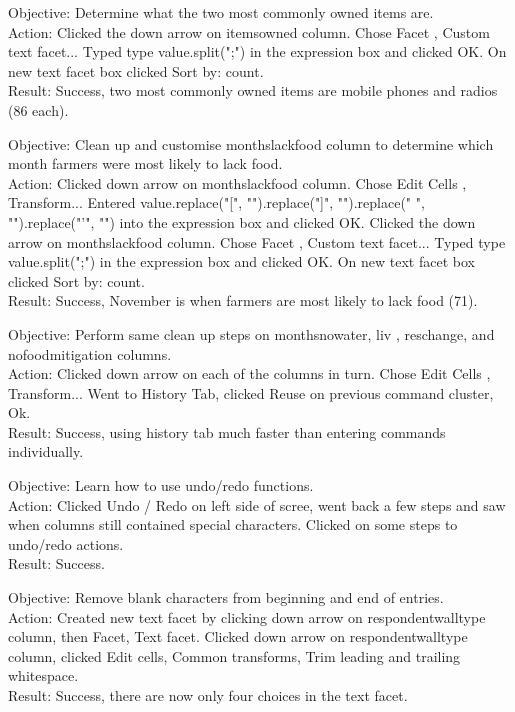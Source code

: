 \documentclass{article}
\begin{document}
Objective: Determine what the two most commonly owned items are.\\
Action: Clicked the down arrow on items\textunderscore owned column. Chose Facet ,  Custom text facet... Typed type value.split(";") in the expression box and clicked OK. On new text facet box clicked Sort by: count.\\
Result: Success, two most commonly owned items are mobile phones and radios (86 each).\newline


Objective: Clean up and customise months\textunderscore lack\textunderscore food column to determine which month farmers were most likely to lack food.\\
Action: Clicked down arrow on months\textunderscore lack\textunderscore food column. Chose Edit Cells ,  Transform... Entered value.replace("[", "").replace("]", "").replace(" ", "").replace("'", "")  into the expression box and clicked OK.  Clicked the down arrow on months\textunderscore lack\textunderscore food column. Chose Facet ,  Custom text facet... Typed type value.split(";") in the expression box and clicked OK. On new text facet box clicked Sort by: count.\\
Result: Success, November is when farmers are most likely to lack food (71).\newline

Objective: Perform same clean up steps on months\textunderscore no\textunderscore water, liv \textunderscoreowned, res\textunderscore change, and no\textunderscore food\textunderscore mitigation columns.\\
Action: Clicked down arrow on each of the columns in turn. Chose Edit Cells ,  Transform... Went to History Tab, clicked Reuse on previous command cluster,  Ok.\\
Result: Success, using history tab much faster than entering commands individually.\newline


Objective: Learn how to use undo/redo functions.\\
Action: Clicked Undo / Redo on left side of scree, went back a few steps and saw when columns still contained special characters. Clicked on some steps to undo/redo actions.\\
Result: Success. \newline

Objective: Remove blank characters from beginning and end of entries.\\
Action: Created new text facet by clicking down arrow on respondent\textunderscore wall\textunderscore type column, then Facet, Text facet. Clicked down arrow on respondent\textunderscore wall\textunderscore type column, clicked Edit cells,  Common transforms, Trim leading and trailing whitespace.\\
Result: Success, there are now only four choices in the text facet.\newline
\end{document}
